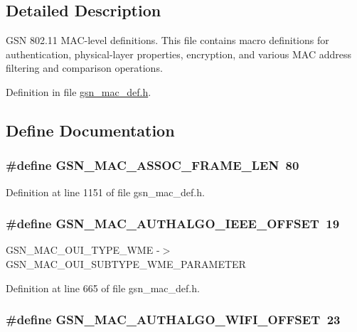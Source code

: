 \subsection{Detailed Description}
GSN 802.11 MAC-\/level definitions. This file contains macro definitions for authentication, physical-\/layer properties, encryption, and various MAC address filtering and comparison operations. 

Definition in file \hyperlink{a00522_source}{gsn\_\-mac\_\-def.h}.



\subsection{Define Documentation}
\hypertarget{a00522_a75298d7c1a91acf7fa7f2d182d22dc1f}{
\subsubsection[{GSN\_\-MAC\_\-ASSOC\_\-FRAME\_\-LEN}]{\setlength{\rightskip}{0pt plus 5cm}\#define GSN\_\-MAC\_\-ASSOC\_\-FRAME\_\-LEN~80}}
\label{a00522_a75298d7c1a91acf7fa7f2d182d22dc1f}


Definition at line 1151 of file gsn\_\-mac\_\-def.h.

\hypertarget{a00522_a3f834791f07b7653474176ab939e21c0}{
\subsubsection[{GSN\_\-MAC\_\-AUTHALGO\_\-IEEE\_\-OFFSET}]{\setlength{\rightskip}{0pt plus 5cm}\#define GSN\_\-MAC\_\-AUTHALGO\_\-IEEE\_\-OFFSET~19}}
\label{a00522_a3f834791f07b7653474176ab939e21c0}
GSN\_\-MAC\_\-OUI\_\-TYPE\_\-WME -\/$>$ GSN\_\-MAC\_\-OUI\_\-SUBTYPE\_\-WME\_\-PARAMETER 

Definition at line 665 of file gsn\_\-mac\_\-def.h.

\hypertarget{a00522_a63f3e42dcf8f37691b201e5c28ff1af4}{
\subsubsection[{GSN\_\-MAC\_\-AUTHALGO\_\-WIFI\_\-OFFSET}]{\setlength{\rightskip}{0pt plus 5cm}\#define GSN\_\-MAC\_\-AUTHALGO\_\-WIFI\_\-OFFSET~23}}
\label{a00522_a63f3e42dcf8f37691b201e5c28ff1af4}



